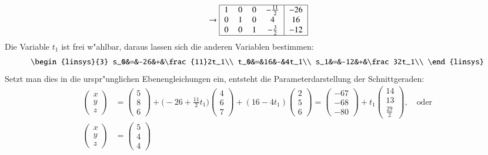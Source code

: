 \begin{beispiel}
\[\begin{tabular}{|>{$}c<{$}>{$}c<{$}>{$}c<{$}>{$}c<{$}|>{$}c<{$}|}
\hline
\end{tabular}
\rightarrow
\begin{tabular}{|>{$}c<{$}>{$}c<{$}>{$}c<{$}>{$}c<{$}|>{$}c<{$}|}
\hline
    1&   0&   0& -\frac{11}2& -26\\
    0&   1&   0&   4&  16\\
    0&   0&   1&  -\frac32& -12\\
\hline
\end{tabular}
\]
Die Variable $t_1$ ist frei w"ahlbar, daraus lassen sich die anderen
Variablen bestimmen:
\[
\begin{linsys}{3}
s_0&=&-26&+&\frac{11}2t_1\\
t_0&=&16&-&4t_1\\
s_1&=&-12&+&\frac32t_1\\
\end{linsys}
\]
Setzt man dies in die urspr"unglichen Ebenengleichungen ein, entsteht
die Parameterdarstellung der Schnittgeraden:
\begin{align*}
\begin{pmatrix}x\\y\\z\end{pmatrix}
&=
\begin{pmatrix}5\\8\\6\end{pmatrix}
+\biggl(-26+\frac{11}2t_1\biggr)\begin{pmatrix}4\\6\\7\end{pmatrix}
+(16-4t_1)\begin{pmatrix}2\\5\\6\end{pmatrix}
=
\begin{pmatrix}-67\\-68\\-80\end{pmatrix}
+t_1
\begin{pmatrix}14\\13\\\frac{29}2\end{pmatrix},\quad\text{oder}
\\
\begin{pmatrix}x\\y\\z\end{pmatrix}
&=
\begin{pmatrix}5\\4\\4\end{pmatrix}

\end{align*}
\end{beispiel}
